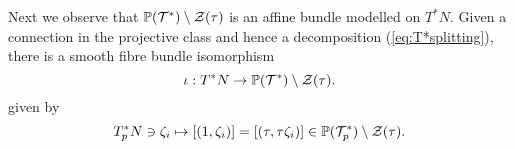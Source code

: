 \begin{rmk}
Next we observe that $\mathbb{P}(\mathcal{T}^*)\setminus \mathcal{Z}(\tau)$ is an affine bundle modelled on $T^* N$. Given a connection in the projective class and hence a decomposition (\ref{eq:T*splitting}), there is a smooth fibre bundle isomorphism
  \begin{equation}\label{key-id}
\iota : T^* N\to \mathbb{P}(\mathcal{T}^*)\setminus \mathcal{Z}(\tau).
    \end{equation}
%
given by
\begin{equation} \label{eq:T*N_is_M}
T_p^*N\ni \zeta_i  \mapsto [(1,\zeta_i)]=[(\tau,\tau \zeta_i)]\in
\mathbb{P}(\mathcal{T}_p^*)\setminus \mathcal{Z}(\tau) .
\end{equation}
\end{rmk}


